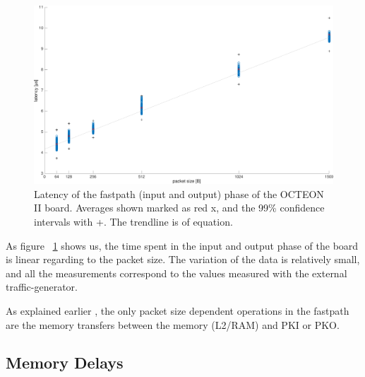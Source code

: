 \begin{figure}[h]
  \begin{center}
    \includegraphics[width=\textwidth]{images/comm-latency.pdf}
    \caption{Latency of the fastpath (input and output) phase of the OCTEON II board. Averages shown marked as red x, and the 99\% confidence intervals with +. The trendline is of equation.}
    \label{fig:comm-latency}
  \end{center}
\end{figure}

As figure ~\ref{fig:comm-latency} shows us, the time spent in the input and output phase of the board is linear regarding to the packet size. The variation of the data is relatively small, and all the measurements correspond to the values measured with the external traffic-generator.


As explained earlier , the only packet size dependent operations in the fastpath are the  memory transfers between the memory (L2/RAM) and PKI or PKO.

\subsection{Memory Delays}

